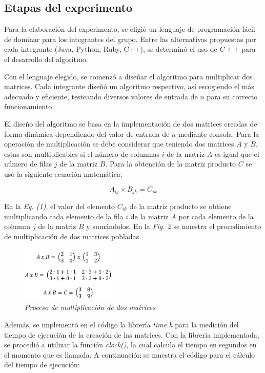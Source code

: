 \documentclass[11pt, twocolumn]{llncs}
\begin{document}
\subsection{Etapas del experimento}
Para la elaboración del experimento, se eligió un lenguaje de programación fácil de dominar para los integrantes del grupo. Entre las alternativas propuestas por cada integrante (Java, Python, Ruby, C++), se determinó el uso de $C++$ para el desarrollo del algoritmo.

Con el lenguaje elegido, se comenzó a diseñar el algoritmo para multiplicar dos matrices. Cada integrante diseñó un algoritmo respectivo, así escogiendo el más adecuado y eficiente, testeando diversos valores de entrada de $n$ para su correcto funcionamiento.

El diseño del algoritmo se basa en la implementación de dos matrices creadas de forma dinámica dependiendo del valor de entrada de $n$ mediante consola. Para la operación de multiplicación se debe considerar que teniendo dos matrices $A$ y $B$, estas son multiplicables si el número de columnas $i$ de la matriz $A$ es igual que el número de filas $j$ de la matriz $B$. Para la obtención de la matriz producto $C$ se usó la siguiente ecuación matemática:

\begin{equation}
A_{ij} \times B_{jk} = C_{ik}
\end{equation}

En la \textit{Eq. (1)}, el valor del elemento $C_{ik}$ de la matriz producto se obtiene multiplicando cada elemento de la fila $i$ de la matriz $A$ por cada elemento de la columna $j$ de la matriz $B$ y sumándolos. En la \textit{Fig. 2} se muestra el procedimiento de multiplicación de dos matrices pobladas.

\begin{figure}
\caption{\textit{\label{fig:multiplicacion}Proceso de multiplicación de dos matrices}}
\centering
\includegraphics[width=0.4\textwidth]{imagenes/multiplicacion.png}
\end{figure}

Además, se implementó en el código la librería \textit{time.h} para la medición del tiempo de ejecución de la creación de las matrices. Con la librería implementada, se procedió a utilizar la función \textit{clock()}, la cual calcula el tiempo en segundos en el momento que es llamada. A continuación se muestra el código para el cálculo del tiempo de ejecución:
\end{document}
